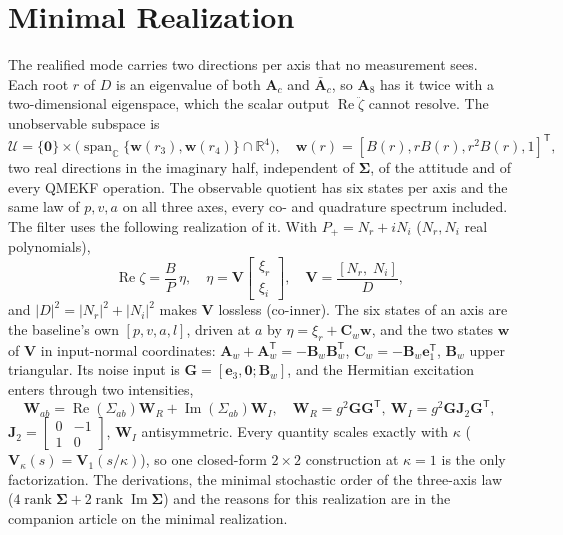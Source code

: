 \documentclass[conference]{IEEEtran}
\DeclareRobustCommand{\vct}[1]{\bm{#1}}
\DeclareRobustCommand{\mat}[1]{\bm{#1}}
\newcommand{\R}{\mathbb{R}}
\newcommand{\C}{\mathbb{C}}
\newcommand{\T}{^{\mathsf T}}
\theoremstyle{bodysmall}
\begin{document}
\section{Minimal Realization}
\label{sec:minimal}
The realified mode carries two directions per axis that no measurement sees.
Each root $r$ of $D$ is an eigenvalue of both $\mat A_c$ and $\bar{\mat A}_c$,
so $\mat A_8$ has it twice with a two-dimensional eigenspace, which the
scalar output $\operatorname{Re}\ddot\zeta$ cannot resolve. The unobservable
subspace is
\begin{equation}
\mathcal U=\{\vct 0\}\times\bigl(\operatorname{span}_\C\{\vct w(r_3),\vct w(r_4)\}\cap\R^4\bigr),\quad
\vct w(r)=[B(r),rB(r),r^2B(r),1]\T,
\end{equation}
two real directions in the imaginary half, independent of $\mat\Sigma$, of the
attitude and of every QMEKF operation. The observable quotient has six
states per axis and the same law of $p,v,a$ on all three axes, every co- and
quadrature spectrum included. The filter uses the following realization of
it. With $P_+=N_r+iN_i$ ($N_r,N_i$ real polynomials),
\begin{equation}
\operatorname{Re}\zeta=\frac BP\,\eta,\quad\eta=\mat V\begin{bmatrix}\xi_r\\\xi_i\end{bmatrix},\quad
\mat V=\frac{[N_r,\;N_i]}D,
\label{eq:cascade}
\end{equation}
and $|D|^2=|N_r|^2+|N_i|^2$ makes $\mat V$ lossless (co-inner). The six states
of an axis are the baseline's own $[p,v,a,l]$, driven at $a$ by
$\eta=\xi_r+\mat C_w\vct w$, and the two states $\vct w$ of $\mat V$ in
input-normal coordinates: $\mat A_w+\mat A_w\T=-\mat B_w\mat B_w\T$,
$\mat C_w=-\mat B_w\vct e_1\T$, $\mat B_w$ upper triangular. Its noise
input is $\mat G=[\vct e_3,\vct 0;\mat B_w]$, and the Hermitian excitation
enters through two intensities,
\begin{equation}
\mat W_{ab}=\operatorname{Re}(\Sigma_{ab})\mat W_R+\operatorname{Im}(\Sigma_{ab})\mat W_I,\quad
\mat W_R=g^2\mat G\mat G\T,\ \mat W_I=g^2\mat G\mat J_2\mat G\T,
\label{eq:W6}
\end{equation}
$\mat J_2=\left[\begin{smallmatrix}0&-1\\1&0\end{smallmatrix}\right]$, $\mat W_I$
antisymmetric. Every quantity scales exactly with $\kappa$
($\mat V_\kappa(s)=\mat V_1(s/\kappa)$), so one closed-form $2\times2$
construction at $\kappa=1$ is the only factorization. The derivations, the
minimal stochastic order of the three-axis law ($4\operatorname{rank}\mat\Sigma
+2\operatorname{rank}\operatorname{Im}\mat\Sigma$) and the reasons for this
realization are in the companion article on the minimal realization.
\end{document}

